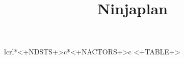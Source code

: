 \documentclass{ucph-revy}
\title{Ninjaplan}
\makeatletter
\def\expandFiHere#1\fi{\fi#1}
\def\taskdesc#1{
  \ifx#1\done\relax\else
    \typeout{\string#1 #1}
    \ifx#1\relax\relax\else
      \typeout{PING}
      \tikz[overlay,remember picture]{
        \node[anchor=west,rotate=270,fill=white,inner sep=0pt]
        at (\expandafter\@gobble\string#1)
        {\sffamily #1};
      }
      \global\let#1=\relax
    \fi
    \expandFiHere
    \taskdesc
  \fi
}
\def\taskdescs{%
  \expandafter\taskdesc\the\taskhangers
}
\makeatother
\begin{document}
\maketitle

\centering

\begin{longtable}{lcrl*{<+NDSTS+>}{c}*{<+NACTORS+>}{c}}
  <+TABLE+>
\end{longtable}
  
\end{document}
